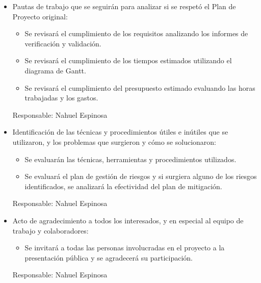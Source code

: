 \documentclass[11pt]{charter}
\begin{document}
\begin{itemize}
\item Pautas de trabajo que se seguirán para analizar si se respetó el Plan de Proyecto original:
\begin{itemize}
  \item Se revisará el cumplimiento de los requisitos analizando los informes de verificación y validación.
  \item Se revisará el cumplimiento de los tiempos estimados utilizando el diagrama de Gantt.
  \item Se revisará el cumplimiento del presupuesto estimado evaluando las horas trabajadas y los gastos.
\end{itemize}
Responsable: Nahuel Espinosa

\item Identificación de las técnicas y procedimientos útiles e inútiles que se utilizaron, y los problemas que surgieron y cómo se solucionaron:
\begin{itemize}
  \item Se evaluarán las técnicas, herramientas y procedimientos utilizados.
  \item Se evaluará el plan de gestión de riesgos y si surgiera alguno de los riesgos identificados, se analizará la efectividad del plan de mitigación.
\end{itemize}
Responsable: Nahuel Espinosa

\item Acto de agradecimiento a todos los interesados, y en especial al equipo de trabajo y colaboradores:
\begin{itemize}
  \item Se invitará a todas las personas involucradas en el proyecto a la presentación pública y se agradecerá su participación.
\end{itemize}
Responsable: Nahuel Espinosa
\end{itemize}
\end{document}
